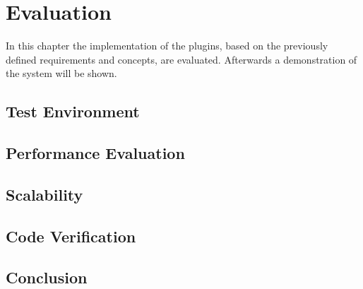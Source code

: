 \chapter{Evaluation}\label{chapter:evaluation}
In this chapter the implementation of the plugins, based on the previously defined requirements and concepts, are evaluated.
Afterwards a demonstration of the system will be shown.

\section{Test Environment}
\doit

\section{Performance Evaluation}
\doit

\section{Scalability}
\doit

\section{Code Verification}
\doit

\section{Conclusion}
\doit
